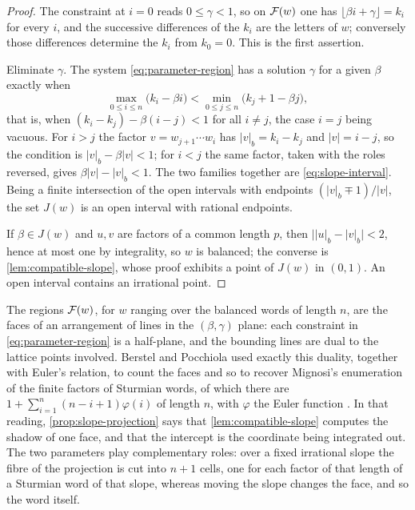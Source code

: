 \begin{proof}
The constraint at $i=0$ reads $0\leqslant\gamma<1$, so on $\mathcal{F}(w)$ one has
$\lfloor\beta i+\gamma\rfloor=k_i$ for every $i$, and the successive
differences of the $k_i$ are the letters of $w$; conversely those
differences determine the $k_i$ from $k_0=0$. This is the first assertion.

Eliminate $\gamma$. The system \eqref{eq:parameter-region} has a solution
$\gamma$ for a given $\beta$ exactly when
$$
 \max_{0\leqslant i\leqslant n}\bigl(k_i-\beta i\bigr)
 <\min_{0\leqslant j\leqslant n}\bigl(k_j+1-\beta j\bigr),
$$
that is, when $(k_i-k_j)-\beta(i-j)<1$ for all $i\neq j$, the case $i=j$
being vacuous. For $i>j$ the factor $v=w_{j+1}\cdots w_i$ has
$\lvert v\rvert_b=k_i-k_j$ and $\lvert v\rvert=i-j$, so the condition is
$\lvert v\rvert_b-\beta\lvert v\rvert<1$; for $i<j$ the same factor, taken
with the roles reversed, gives $\beta\lvert v\rvert-\lvert v\rvert_b<1$.
The two families together are \eqref{eq:slope-interval}. Being a finite
intersection of the open intervals with endpoints
$(\lvert v\rvert_b\mp1)/\lvert v\rvert$, the set $J(w)$ is an open interval
with rational endpoints.

If $\beta\in J(w)$ and $u,v$ are factors of a common length $p$, then
$\bigl\lvert\lvert u\rvert_b-\lvert v\rvert_b\bigr\rvert<2$, hence at most
one by integrality, so $w$ is balanced; the converse is
\cref{lem:compatible-slope}, whose proof exhibits a point of $J(w)$ in
$(0,1)$. An open interval contains an irrational point.
\end{proof}

\begin{remark}
\label{rem:duality}
The regions $\mathcal{F}(w)$, for $w$ ranging over the balanced words of length
$n$, are the faces of an arrangement of lines in the $(\beta,\gamma)$ plane:
each constraint in \eqref{eq:parameter-region} is a half-plane, and the
bounding lines are dual to the lattice points involved. Berstel and
Pocchiola used exactly this duality, together with Euler's relation, to
count the faces and so to recover Mignosi's enumeration of the finite
factors of Sturmian words, of which there are
$1+\sum_{i=1}^{n}(n-i+1)\varphi(i)$ of length $n$, with $\varphi$ the Euler
function \cite{BerstelPocchiola1993,Mignosi1991}. In that reading,
\cref{prop:slope-projection} says that
\cref{lem:compatible-slope} computes the shadow of one face, and that the
intercept is the coordinate being integrated out. The two parameters play
complementary roles: over a fixed irrational slope the fibre of the
projection is cut into $n+1$ cells, one for each factor of that length of a
Sturmian word of that slope, whereas moving the slope changes the face, and
so the word itself.
\end{remark}

